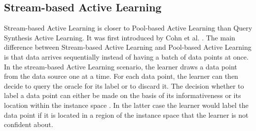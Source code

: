 \subsection{Stream-based Active Learning}
\label{sec:StreamBasedActiveLearning}
Stream-based Active Learning is closer to Pool-based Active Learning than Query Synthesis Active Learning. It was first introduced by Cohn et al. 
\cite{cohn1994improving}. The main difference between Stream-based Active Learning and Pool-based Active Learning is that data arrives sequentially
instead of having a batch of data points at once. In the stream-based Active Learning scenario, the learner draws a data point from the data source
one at a time. For each data point, the learner can then decide to query the oracle for its label or to discard it. The decision whether to label a
data point can either be made on the basis of its informativeness \cite{dagan1995committee} or its location within the instance space \cite{cohn1994improving}.
In the latter case the learner would label the data point if it is located in a region of the instance space that the learner is not confident about.

